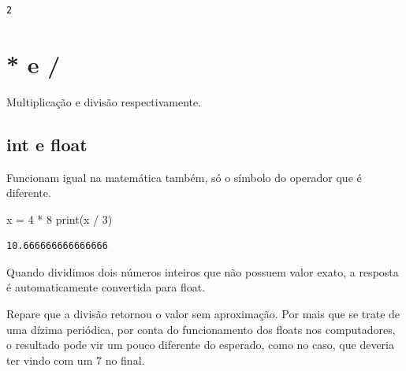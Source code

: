 \documentclass[
  letterpaper,
  DIV=11,
  numbers=noendperiod]{scrreprt}
\newenvironment{Shaded}{\begin{snugshade}}{\end{snugshade}}
\newcommand{\BuiltInTok}[1]{\textcolor[rgb]{0.00,0.23,0.31}{#1}}
\newcommand{\DecValTok}[1]{\textcolor[rgb]{0.68,0.00,0.00}{#1}}
\newcommand{\NormalTok}[1]{\textcolor[rgb]{0.00,0.23,0.31}{#1}}
\newcommand{\OperatorTok}[1]{\textcolor[rgb]{0.37,0.37,0.37}{#1}}
\begin{document}
\begin{tcolorbox}[enhanced jigsaw, breakable, leftrule=.75mm, left=2mm, opacityback=0, bottomrule=.15mm, toprule=.15mm, rightrule=.15mm, arc=.35mm, colback=white]

\begin{verbatim}
2
\end{verbatim}

\end{tcolorbox}

\hypertarget{e}{%
\section{* e /}\label{e}}

Multiplicação e divisão respectivamente.

\hypertarget{int-e-float-1}{%
\subsection{int e float}\label{int-e-float-1}}

Funcionam igual na matemática também, só o símbolo do operador que é
diferente.

\begin{Shaded}
\begin{Highlighting}[]
\NormalTok{x }\OperatorTok{=} \DecValTok{4} \OperatorTok{*} \DecValTok{8}
\BuiltInTok{print}\NormalTok{(x }\OperatorTok{/} \DecValTok{3}\NormalTok{)}
\end{Highlighting}
\end{Shaded}

\begin{tcolorbox}[enhanced jigsaw, breakable, leftrule=.75mm, left=2mm, opacityback=0, bottomrule=.15mm, toprule=.15mm, rightrule=.15mm, arc=.35mm, colback=white]

\begin{verbatim}
10.666666666666666
\end{verbatim}

\end{tcolorbox}

Quando dividimos dois números inteiros que não possuem valor exato, a
resposta é automaticamente convertida para float.

Repare que a divisão retornou o valor sem aproximação. Por mais que se
trate de uma dízima periódica, por conta do funcionamento dos floats nos
computadores, o resultado pode vir um pouco diferente do esperado, como
no caso, que deveria ter vindo com um 7 no final.
\end{document}
